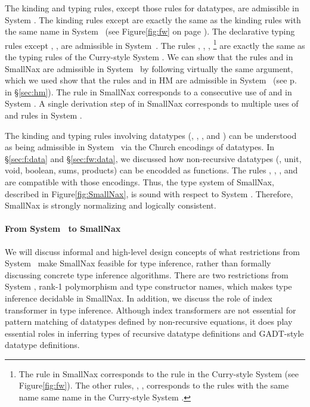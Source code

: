 The kinding and typing rules, except those rules for datatypes, are admissible
in System \Fw. The kinding rules except  are exactly the same as
the kinding rules with the same name in System \Fw\ (see Figure\;\ref{fig:fw}
on page \pageref{fig:fw}). The declarative typing rules except ,
,  are admissible in System~\Fw. The rules
, , , \footnote{
	The  rule in SmallNax corresponds to
	the  rule in the Curry-style System \Fw
	(see Figure\;\ref{fig:fw}). The other rules, ,
	,  corresponds to the rules with
	the same name same name in the Curry-style System \Fw. }
are exactly the same as the typing rules of the Curry-style System \Fw.
We can show that the rules  and  in SmallNax are
admissible in System \Fw\ by following virtually the same argument, which
we used show that the rules  and  in HM are
admissible in System \F\ (see p.\pageref{hm:LetAdmissibleFw} in \S\ref{sec:hm}).
The  rule in SmallNax corresponds to a consecutive use of
 and  in System \Fw. A single derivation step of
 in SmallNax corresponds to multiple uses of 
and  rules in System \Fw.

The kinding and typing rules involving datatypes (,
, , and ) can be understood as
being admissible in System \Fw\ via the Church encodings of datatypes.
In \S\ref{sec:f:data} and \S\ref{sec:fw:data}, we discussed
how non-recursive datatypes (\eg, unit, void, boolean, sums, products)
can be encodded as functions. The rules , ,
, and  are compatible with those encodings.
Thus, the type system of SmallNax, described in Figure\;\ref{fig:SmallNax},
is sound with respect to System \Fw.
Therefore, SmallNax is strongly normalizing and logically consistent.

\paragraph{From System \Fw\ to SmallNax}
We will discuss informal and high-level design concepts of what restrictions
from System \Fw\ make SmallNax feasible for type inference, rather than
formally discussing concrete type inference algorithms. There are two
restrictions from System \Fw, rank-1 polymorphism and type constructor names,
which makes type inference decidable in SmallNax. In addition, we discuss
the role of index transformer in type inference. Although index transformers
are not essential for pattern matching of datatypes defined by non-recursive
equations, it does play essential roles in inferring types of recursive
datatype definitions and GADT-style datatype definitions.

